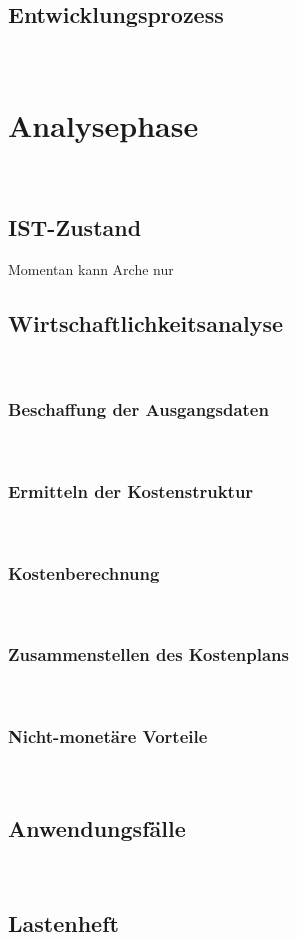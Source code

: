\documentclass[11pt,toc=sectionentrywithoutdots, 
headheight=44pt, headings=optiontoheadandtoc, hyperfootnotes=false, hypertexnames=false]{scrartcl}
\begin{document}
\subsection{Entwicklungsprozess}
\blindtext\

\section{Analysephase}
\blindtext\

\subsection{IST-Zustand}
Momentan kann Arche nur

\subsection{Wirtschaftlichkeitsanalyse}
\blindtext\

\subsubsection{Beschaffung der Ausgangsdaten}
\blindtext\

\subsubsection{Ermitteln der Kostenstruktur}
\blindtext\

\subsubsection{Kostenberechnung}
\blindtext\

\subsubsection{Zusammenstellen des Kostenplans}
\blindtext\

\subsubsection{Nicht-monetäre Vorteile}
\blindtext\

\subsection{Anwendungsfälle}
\blindtext\

\subsection{Lastenheft}
\blindtext\
\end{document}
